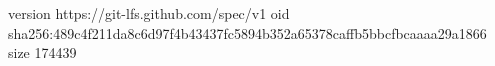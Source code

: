 version https://git-lfs.github.com/spec/v1
oid sha256:489c4f211da8c6d97f4b43437fc5894b352a65378caffb5bbcfbcaaaa29a1866
size 174439
